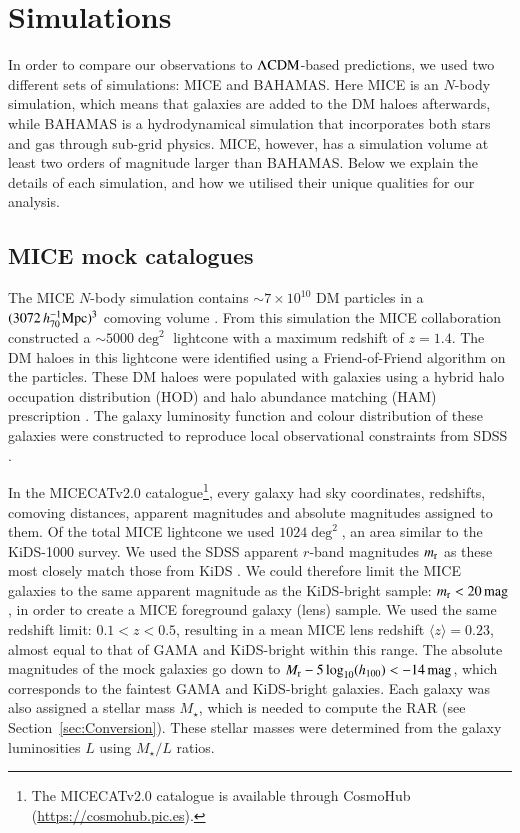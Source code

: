 \documentclass{aa}
\newcommand{\hMpc}{\,h_{70}^{-1}{\rm{Mpc}} }
\newcommand{\magn}{\,{\rm mag} }
\newcommand{\lcdm}{{\rm \Lambda CDM}}
\newcommand*{\meanb}[1]{\langle{#1}\rangle}
\newcommand*{\E}[1]{\times 10^{#1}}
\newcommand{\un}[1]{_{\rm #1}}
\begin{document}
\section{Simulations}
\label{sec:Simulations}

In order to compare our observations to $\lcdm$-based predictions, we used two different sets of simulations: MICE and BAHAMAS. Here MICE is an $N$-body simulation, which means that galaxies are added to the DM haloes afterwards, while BAHAMAS is a hydrodynamical simulation that incorporates both stars and gas through sub-grid physics. MICE, however, has a simulation volume at least two orders of magnitude larger than BAHAMAS. Below we explain the details of each simulation, and how we utilised their unique qualities for our analysis.

\subsection{MICE mock catalogues}
\label{sec:MICE}

The MICE $N$-body simulation contains $\sim 7\E{10}$ DM particles in a $(3072 \hMpc)^3$ comoving volume \cite[]{fosalba2015b}. From this simulation the MICE collaboration constructed a $\sim5000\deg^2$ lightcone with a maximum redshift of $z=1.4$. The DM haloes in this lightcone were identified using a Friend-of-Friend algorithm on the particles. These DM haloes were populated with galaxies using a hybrid halo occupation distribution (HOD) and halo abundance matching (HAM) prescription \cite[]{carretero2015,crocce2015}. The galaxy luminosity function and colour distribution of these galaxies were constructed to reproduce local observational constraints from SDSS \cite[]{blanton2003a, blanton2003b, blanton2005}.

In the MICECATv2.0 catalogue\footnote{The MICECATv2.0 catalogue is available through CosmoHub (\url{https://cosmohub.pic.es}).}, every galaxy had sky coordinates, redshifts, comoving distances, apparent magnitudes and absolute magnitudes assigned to them. Of the total MICE lightcone we used $1024\deg^2$, an area similar to the KiDS-1000 survey. We used the SDSS apparent $r$-band magnitudes $m\un{r}$ as these most closely match those from KiDS \cite[see][]{brouwer2018}. We could therefore limit the MICE galaxies to the same apparent magnitude as the KiDS-bright sample: $m\un{r}<20 \, {\rm mag}$, in order to create a MICE foreground galaxy (lens) sample. We used the same redshift limit: $0.1<z<0.5$, resulting in a mean MICE lens redshift $\meanb{z}=0.23$, almost equal to that of GAMA and KiDS-bright within this range. The absolute magnitudes of the mock galaxies go down to $M\un{r} - 5\log_{10}(h_{100}) < -14 \magn$, which corresponds to the faintest GAMA and KiDS-bright galaxies. Each galaxy was also assigned a stellar mass $M_\star$, which is needed to compute the RAR (see Section~\ref{sec:Conversion}). These stellar masses were determined from the galaxy luminosities $L$ using \cite{bell2001} $M_\star/L$ ratios.
\end{document}
